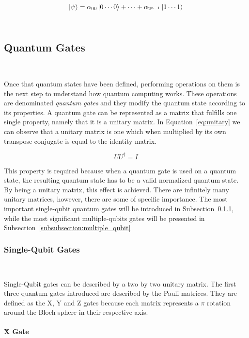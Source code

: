 \begin{equation}\label{eq:multiple_qubits}
  \ket{\psi} = \alpha_{00}\ket{0\cdots0} + \cdots + \alpha_{2^{n-1}}\ket{1\cdots1}
\end{equation} \

\subsection{Quantum Gates}\label{subsection:gates}\

Once that quantum states have been defined, performing operations
on them is the next step to understand how quantum computing works.
These operations are denominated \textit{quantum gates} and they
modify the quantum state according to its properties. A quantum gate
can be represented as a matrix that fulfills one single property,
namely that it is a unitary matrix. In Equation~\ref{eq:unitary} we
can observe that a unitary matrix is one which when multiplied by its
own transpose conjugate is equal to the identity matrix.

\begin{equation}\label{eq:unitary}
  UU^{\dag} = I
\end{equation}

This property is required because when a quantum gate is used on a
quantum state, the resulting quantum state has to be a valid normalized
quantum state. By being a unitary matrix, this effect is achieved.
There are infinitely many unitary matrices, however, there are some
of specific importance. The most important single-qubit quantum
gates will be introduced in Subsection~\ref{subsubsection:single_qubit},
while the most significant multiple-qubits gates will be presented
in Subsection~\ref{subsubsection:multiple_qubit} \

\subsubsection{Single-Qubit Gates}\label{subsubsection:single_qubit} \

Single-Qubit gates can be described by a two by two unitary matrix. The
first three quantum gates introduced are described by the Pauli matrices.
They are defined as the X, Y and Z gates because each matrix represents
a \(\pi\) rotation around the Bloch sphere in their respective axis. \

\paragraph{X Gate} \


